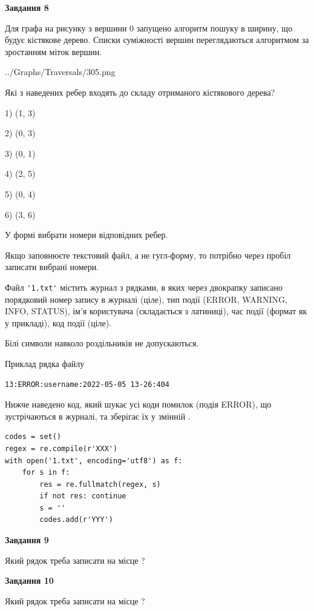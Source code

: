 \documentclass[12pt, ukrainian]{article}
\def\code#1{\Verb!#1!}
\begin{document}
{\begin {large}
{\begin {center}\textbf{Завдання 8}\end {center}}\par
Для графа на рисунку з вершини 0 запущено алгоритм пошуку в ширину, що будує кістякове дерево. Списки суміжності вершин переглядаються алгоритмом за зростанням міток вершин.\par
\begin{center}
	{../Graphs/Traversals/305.png}
\end{center}
\par Які з наведених ребер входять до складу отриманого кістякового дерева?\par
1) (1, 3)\par
2) (0, 3)\par
3) (0, 1)\par
4) (2, 5)\par
5) (0, 4)\par
6) (3, 6)\par
{\vskip 15pt} У формі вибрати номери відповідних ребер.


Якщо заповнюєте текстовий файл, а не гугл-форму, то потрібно через пробіл записа\-ти вибрані номери.\par
\newpage


Файл \code{'1.txt'} містить журнал з рядками, в яких через двокрапку записано поряд\-ко\-вий номер запису в журналі (ціле), тип події (ERROR, WARNING, INFO, STATUS), ім'я користувача (складається з латиниці), час події (фор\-мат як у прикладі), код події (ціле).

Білі символи навколо роздільників не допускаються.

Приклад рядка файлу



\begin{verbatim}
13:ERROR:username:2022-05-05 13-26:404
\end{verbatim}


Нижче наведено код, який шукає усі коди помилок (подія ERROR), що зустріча\-ють\-ся в журналі, та зберігає їх у змінній .



\begin{verbatim}
codes = set()
regex = re.compile(r'XXX')
with open('1.txt', encoding='utf8') as f:
    for s in f:
        res = re.fullmatch(regex, s)
        if not res: continue
        s = ''
        codes.add(r'YYY')
\end{verbatim}


{\begin {center}\textbf{Завдання 9}\end {center}}\par
Який рядок треба записати на місце  ?\par
\vspace{5mm}


{\begin {center}\textbf{Завдання 10}\end {center}}\par
Який рядок треба записати на місце  ?\par


\newpage


\end {large}}
\end{document}
